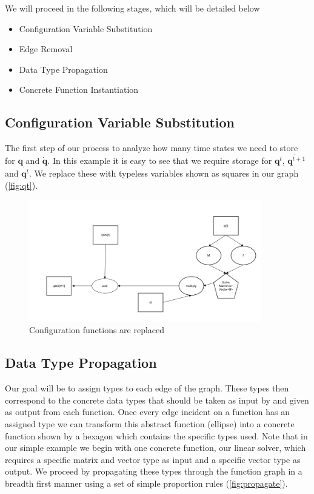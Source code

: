 \documentclass{article}
\begin{document}
We will proceed in the following stages, which will be detailed below
\begin{itemize}
\item Configuration Variable Substitution
\item Edge Removal
\item Data Type Propagation
\item Concrete Function Instantiation
\end{itemize}

\subsection{Configuration Variable Substitution}
The first step of our process to analyze how many time states we need to store for $\mathbf{q}$ and $\dot{\mathbf{q}}$. In this example it is easy to see that we require storage for $\mathbf{q}^t$, $\dot{\mathbf{q}^{t+1}}$ and $\dot{\mathbf{q}^{t}}$. We replace these with typeless variables shown as squares in our graph (\autoref{fig:qt}).

\begin{figure}[h]
\includegraphics[width=0.9\textwidth]{figures/qtsubstitution}
\caption{Configuration functions are replaced  }
\label{fig:qt}
\end{figure}

\subsection{Data Type Propagation}
Our goal will be to assign types to each edge of the graph. These types then correspond to the concrete data types that should be taken as input by and given as output from each function. Once every edge incident on a function has an assigned type we can transform this abstract function (ellipse) into a concrete function shown by a hexagon which contains the specific types used. Note that in our simple example we begin with one concrete function, our linear solver, which requires a specific matrix and vector type as input and a specific vector type as output. We proceed by propagating these types through the function graph in a breadth first manner using a set of simple proportion rules (\autoref{fig:propagate}).
\end{document}
